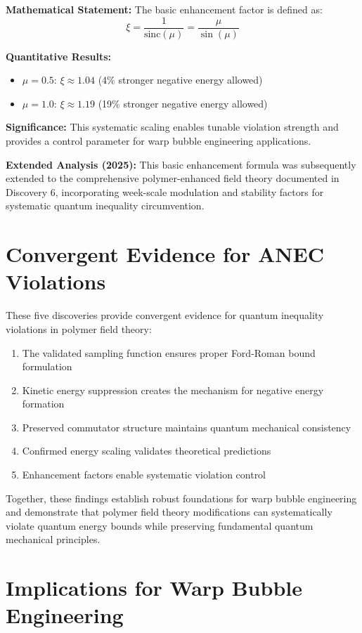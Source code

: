 \documentclass[11pt]{article}
\begin{document}
\textbf{Mathematical Statement:}
The basic enhancement factor is defined as:
$$\xi = \frac{1}{\text{sinc}(\mu)} = \frac{\mu}{\sin(\mu)}$$

\textbf{Quantitative Results:}
\begin{itemize}
    \item $\mu = 0.5$: $\xi \approx 1.04$ (4\% stronger negative energy allowed)
    \item $\mu = 1.0$: $\xi \approx 1.19$ (19\% stronger negative energy allowed)
\end{itemize}

\textbf{Significance:} This systematic scaling enables tunable violation strength and provides a control parameter for warp bubble engineering applications.

\textbf{Extended Analysis (2025):} This basic enhancement formula was subsequently extended to the comprehensive polymer-enhanced field theory documented in Discovery 6, incorporating week-scale modulation and stability factors for systematic quantum inequality circumvention.

\section{Convergent Evidence for ANEC Violations}

These five discoveries provide convergent evidence for quantum inequality violations in polymer field theory:

\begin{enumerate}
    \item The validated sampling function ensures proper Ford-Roman bound formulation
    \item Kinetic energy suppression creates the mechanism for negative energy formation
    \item Preserved commutator structure maintains quantum mechanical consistency
    \item Confirmed energy scaling validates theoretical predictions
    \item Enhancement factors enable systematic violation control
\end{enumerate}

Together, these findings establish robust foundations for warp bubble engineering and demonstrate that polymer field theory modifications can systematically violate quantum energy bounds while preserving fundamental quantum mechanical principles.

\section{Implications for Warp Bubble Engineering}
\end{document}
